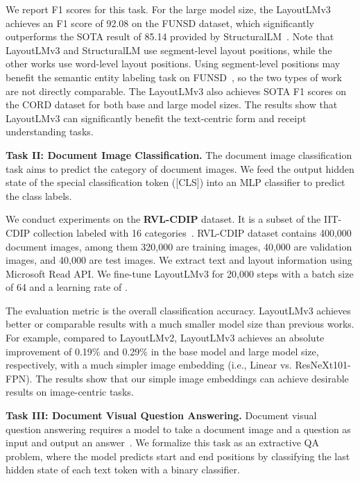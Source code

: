 \documentclass[sigconf]{acmart}
\begin{document}
We report F1 scores for this task.
For the large model size, the LayoutLMv3 achieves an F1 score of 92.08 on the FUNSD dataset, which significantly outperforms the SOTA result of 85.14 provided by StructuralLM~\cite{Li2021StructuralLMSP}.
Note that LayoutLMv3 and StructuralLM use segment-level layout positions, while the other works use word-level layout positions. Using segment-level positions may benefit the semantic entity labeling task on FUNSD~\cite{Li2021StructuralLMSP}, so the two types of work are not directly comparable.
The LayoutLMv3 also achieves SOTA F1 scores on the CORD dataset for both base and large model sizes.
The results show that LayoutLMv3 can significantly benefit the text-centric form and receipt understanding tasks.


\noindent \textbf{Task II: Document Image Classification.}
The document image classification task aims to predict the category of document images.
We feed the output hidden state of the special classification token ([CLS]) into an MLP classifier to predict the class labels.

We conduct experiments on the \textbf{RVL-CDIP} dataset.
It is a subset of the IIT-CDIP collection labeled with 16 categories~\cite{harley2015icdar}. 
RVL-CDIP dataset contains 400,000 document images, among them 320,000 are training images, 40,000 are validation images, and 40,000 are test images.
We extract text and layout information using Microsoft Read API.
We fine-tune LayoutLMv3 for 20,000 steps with a batch size of 64 and a learning rate of .


The evaluation metric is the overall classification accuracy.
LayoutLMv3 achieves better or comparable results with a much smaller model size than previous works.
For example, compared to LayoutLMv2, LayoutLMv3 achieves an absolute improvement of 0.19\% and 0.29\% in the base model and large model size, respectively, with a much simpler image embedding (i.e., Linear vs. ResNeXt101-FPN).
The results show that our simple image embeddings can achieve desirable results on image-centric tasks.


\noindent \textbf{Task III: Document Visual Question Answering.}
Document visual question answering requires a model to take a document image and a question as input and output an answer~\cite{mathew2021docvqa}.
We formalize this task as an extractive QA problem, where the model predicts start and end positions by classifying the last hidden state of each text token with a binary classifier.
\end{document}
